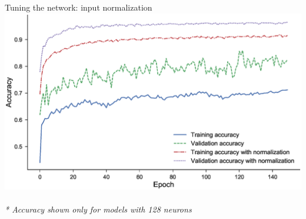 \documentclass{beamer}
\begin{document}
\begin{frame}{Tuning the network: input normalization}
\includegraphics[width=\textwidth]{img/normalization_acc_cmp}	\\~\\
\tiny{\textit{* Accuracy shown only for models with 128 neurons}}	
\end{frame}
	
\end{document}
